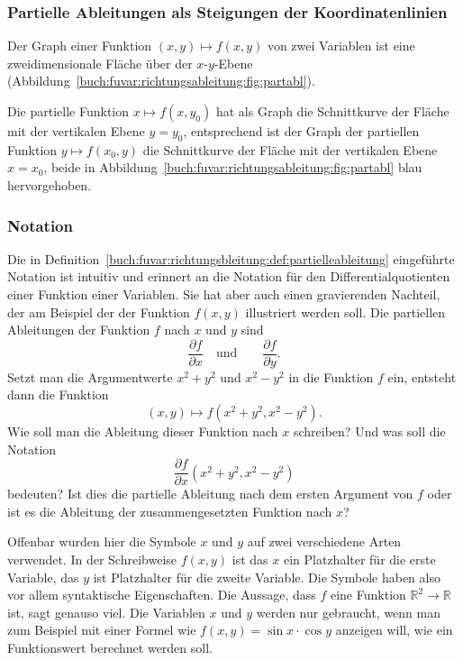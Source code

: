%
%
\subsubsection{Partielle Ableitungen als Steigungen der Koordinatenlinien}
Der Graph einer Funktion $(x,y)\mapsto f(x,y)$ von zwei Variablen ist 
eine zweidimensionale Fläche über der $x$-$y$-Ebene
(Abbildung~\ref{buch:fuvar:richtungsableitung:fig:partabl}).

Die partielle Funktion $x\mapsto f(x,y_0)$ hat als Graph die Schnittkurve
der Fläche mit der vertikalen Ebene $y=y_0$, entsprechend ist der Graph
der partiellen Funktion $y\mapsto f(x_0,y)$ die Schnittkurve der Fläche
mit der vertikalen Ebene $x=x_0$, beide in
Abbildung~\ref{buch:fuvar:richtungsableitung:fig:partabl} blau hervorgehoben.

%
%
\subsubsection{Notation}
Die in Definition~\ref{buch:fuvar:richtungsbleitung:def:partielleableitung}
eingeführte Notation ist intuitiv und erinnert an die Notation für den
Differentialquotienten einer Funktion einer Variablen.
Sie hat aber auch einen gravierenden Nachteil, der am Beispiel der
der Funktion $f(x,y)$ illustriert werden soll.
Die partiellen Ableitungen der Funktion $f$ nach $x$ und $y$ sind
\[
\frac{\partial f}{\partial x}
\quad\text{und}\qquad
\frac{\partial f}{\partial y}.
\]
Setzt man die Argumentwerte $x^2+y^2$ und $x^2-y^2$ in die Funktion
$f$ ein, entsteht dann die Funktion
\begin{equation}
(x,y) \mapsto f(x^2+y^2,x^2-y^2).
\label{buch:fuvar:richtungsableitung:eqn:feingesetzt}
\end{equation}
Wie soll man die Ableitung dieser Funktion nach $x$ schreiben?
Und was soll die Notation
\[
\frac{\partial f}{\partial x}(x^2+y^2,x^2-y^2)
\]
bedeuten?
Ist dies die partielle Ableitung nach dem ersten Argument von $f$
oder ist es die Ableitung der zusammengesetzten Funktion nach $x$?

Offenbar wurden hier die Symbole $x$ und $y$ auf zwei verschiedene
Arten verwendet.
In der Schreibweise $f(x,y)$ ist das $x$ ein Platzhalter für die
erste Variable, das $y$ ist Platzhalter für die zweite Variable.
Die Symbole haben also vor allem syntaktische Eigenschaften.
Die Aussage, dass $f$ eine Funktion $\mathbb{R}^2\to\mathbb{R}$
ist, sagt genauso viel.
Die Variablen $x$ und $y$ werden nur gebraucht, wenn man zum
Beispiel mit einer Formel wie $f(x,y)=\sin x\cdot\cos y$ 
anzeigen will, wie ein Funktionswert berechnet werden soll.

